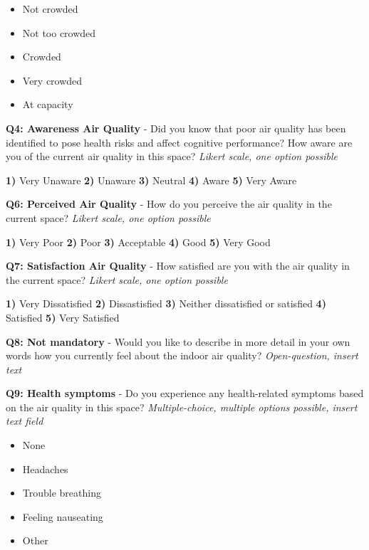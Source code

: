 \begin{appendices}
\begin{itemize}
    \item Not crowded
    \item Not too crowded
    \item Crowded
    \item Very crowded
    \item At capacity
\end{itemize}

\textbf{Q4: Awareness Air Quality} - Did you know that poor air quality has been identified to pose health risks and affect cognitive performance? How aware are you of the current air quality in this space? \textit{Likert scale, one option possible}

\textbf{1)} Very Unaware \textbf{2)} Unaware \textbf{3)} Neutral \textbf{4)} Aware \textbf{5)} Very Aware

\vspace{10pt}

\textbf{Q6: Perceived Air Quality} - How do you perceive the air quality in the current space? \textit{Likert scale, one option possible}

\textbf{1)} Very Poor \textbf{2)} Poor \textbf{3)} Acceptable \textbf{4)} Good \textbf{5)} Very Good 

\vspace{10pt}

\textbf{Q7: Satisfaction Air Quality} - How satisfied are you with the air quality in the current space? \textit{Likert scale, one option possible}

\textbf{1)} Very Dissatisfied \textbf{2)} Dissastisfied \textbf{3)} Neither dissatisfied or satisfied \textbf{4)} Satisfied \textbf{5)} Very Satisfied

\vspace{10pt}

\textbf{Q8: Not mandatory} - Would you like to describe in more detail in your own words how you currently feel about the indoor air quality? \textit{Open-question, insert text}

\vspace{10pt}

\textbf{Q9: Health symptoms} - Do you experience any health-related symptoms based on the air quality in this space? \textit{Multiple-choice, multiple options possible, insert text field}

\begin{itemize}
    \item None
    \item Headaches
    \item Trouble breathing
    \item Feeling nauseating
    \item Other
\end{itemize}


\end{appendices}
